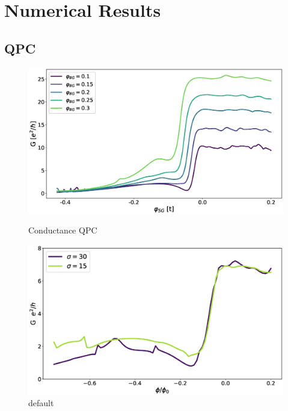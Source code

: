 \chapter{Numerical Results}
\label{ch:numerical-results}

\section{QPC}
\begin{figure}[ht]
\begin{minipage}[b]{0.49\linewidth}
\centering
\includegraphics[width=\textwidth]{figure/numericalmodel/qpc-conductance}
\caption{Conductance QPC} \label{fig:qpc-conductance}
\end{minipage}
\begin{minipage}[b]{0.49\linewidth}
\centering
\includegraphics[width=\textwidth]{figure/numericalmodel/conductance-sigma}
\caption{default}\label{fig:qpc-conductance-sigma}
\end{minipage}
\end{figure}


